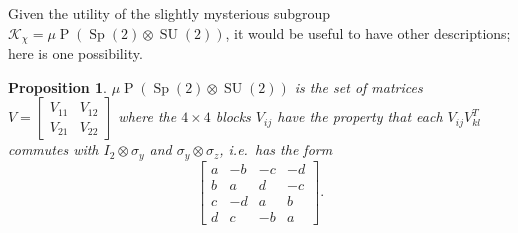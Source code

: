 \documentclass[reqno]{amsart}
\newtheorem{proposition}[theorem]{Proposition}
\theoremstyle{definition} \newtheorem{example}[theorem]{Example}
\newcommand{\SU}{\operatorname{SU}}
\newcommand{\Sp}{\operatorname{Sp}}
\renewcommand{\P}{\operatorname{P}}
\newcommand{\K}{\mathcal{K}}
\begin{document}
Given the utility of the slightly mysterious subgroup $\K_\chi = \mu \P(\Sp(2) \otimes \SU(2))$, it would be useful to have other descriptions; here is one possibility.
\begin{proposition} \label{prop:K1-2}
$\mu \P(\Sp(2) \otimes \SU(2))$ is the set of matrices $V = \left[\begin{smallmatrix} V_{11} & V_{12} \\ V_{21} & V_{22} \end{smallmatrix}\right]$ where the $4 \times 4$ blocks $V_{ij}$ have the property that each $V_{ij}V_{kl}^T$ commutes with $I_2 \otimes \sigma_y$ and $\sigma_y \otimes \sigma_z$, i.e.\ has the form
\begin{equation} \label{eq:SU-I-2}
\begin{bmatrix}
a & -b & -c & -d\\
b & a  & d  & -c\\
c & -d & a & b\\
d & c  & -b & a
\end{bmatrix}.
\end{equation}
\end{proposition}
\end{document}
